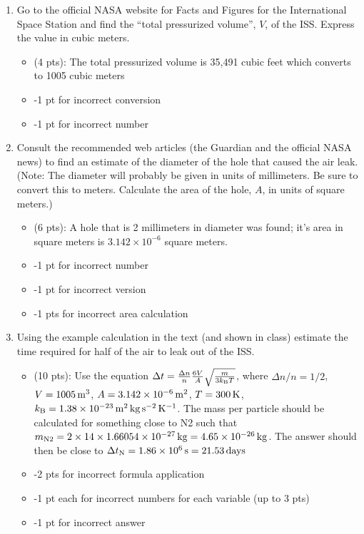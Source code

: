 \documentclass[12pt]{article}
\begin{document}
\begin{enumerate}
    \item[a.] Go to the official NASA website for Facts and Figures for the International Space Station and find the ``total pressurized volume'', $V$, of the ISS. Express the value in cubic meters.
    \begin{itemize}
        \item (4 pts): The total pressurized volume is 35,491 cubic feet which converts to 1005 cubic meters
        \item -1 pt for incorrect conversion
        \item -1 pt for incorrect number
    \end{itemize}
    \item[b.] Consult the recommended web articles (the Guardian and the
    official NASA news) to find an estimate of the diameter of the hole that
    caused the air leak. (Note: The diameter will probably be given in units of
    millimeters. Be sure to convert this to meters. Calculate the area of the
    hole, $A$, in units of square meters.)
    \begin{itemize}
        \item (6 pts): A hole that is 2 millimeters in diameter was found; it's area in square meters is $3.142\times10^{-6}$ square meters.
        \item -1 pt for incorrect number
        \item -1 pt for incorrect version
        \item -1 pts for incorrect area calculation
    \end{itemize}
    \item[c.] Using the example calculation in the text (and shown in class) estimate the time required for half of the air to leak out of the ISS.
    \begin{itemize}
        \item (10 pts): Use the equation $\Delta t = \frac{\Delta n}{n}
        \frac{6V}{A}\sqrt{\frac{m}{3k_{\rm{B}}T}}$, where $\Delta n/n = 1/2$, $V
        = 1005\,\rm{m}^3$, $A = 3.142\times10^{-6}\,\rm{m}^2$, $T=300\,\rm{K}$,
        $k_{\rm{B}} =1.38\times10^{-23}\,\rm{m^2\,kg\,s^{-2}\,K^{-1}}$. \newline\newline The mass
        per particle should be calculated for something close to N2 such
        that $m_{\rm{N2}}=2\times14\times1.66054\times10^{-27}\,\rm{kg} = 4.65\times10^{-26}\,\rm{kg}$. 
        \newline\newline The answer should then be close to $\Delta t_{\rm{N}} = 1.86\times10^6\,\rm{s} = 21.53\,\rm{days}$
        \item -2 pts for incorrect formula application
        \item -1 pt each for incorrect numbers for each variable (up to 3 pts)
        \item -1 pt for incorrect answer
    \end{itemize}
\end{enumerate}
\end{document}
